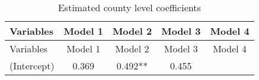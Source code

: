 \documentclass[12pt,twoside]{reedthesis}
\begin{document}
  \begin{longtable}[]{@{}lcccc@{}}
  \caption{Estimated county level coefficients \label{tab:county_coef}}\tabularnewline
  \toprule
  \begin{minipage}[b]{0.26\columnwidth}\raggedright\strut
  Variables\strut
  \end{minipage} & \begin{minipage}[b]{0.12\columnwidth}\centering\strut
  Model 1\strut
  \end{minipage} & \begin{minipage}[b]{0.13\columnwidth}\centering\strut
  Model 2\strut
  \end{minipage} & \begin{minipage}[b]{0.14\columnwidth}\centering\strut
  Model 3\strut
  \end{minipage} & \begin{minipage}[b]{0.14\columnwidth}\centering\strut
  Model 4\strut
  \end{minipage}\tabularnewline
  \midrule
  \endfirsthead
  \toprule
  \begin{minipage}[b]{0.26\columnwidth}\raggedright\strut
  Variables\strut
  \end{minipage} & \begin{minipage}[b]{0.12\columnwidth}\centering\strut
  Model 1\strut
  \end{minipage} & \begin{minipage}[b]{0.13\columnwidth}\centering\strut
  Model 2\strut
  \end{minipage} & \begin{minipage}[b]{0.14\columnwidth}\centering\strut
  Model 3\strut
  \end{minipage} & \begin{minipage}[b]{0.14\columnwidth}\centering\strut
  Model 4\strut
  \end{minipage}\tabularnewline
  \midrule
  \endhead
  \begin{minipage}[t]{0.26\columnwidth}\raggedright\strut
  (Intercept)\strut
  \end{minipage} & \begin{minipage}[t]{0.12\columnwidth}\centering\strut
  0.369\strut
  \end{minipage} & \begin{minipage}[t]{0.13\columnwidth}\centering\strut
  0.492**\strut
  \end{minipage} & \begin{minipage}[t]{0.14\columnwidth}\centering\strut
  0.455\strut
  \end{minipage} & \begin{minipage}[t]{0.14\columnwidth}\centering\strut

\end{minipage}
\end{longtable}
\end{document}
